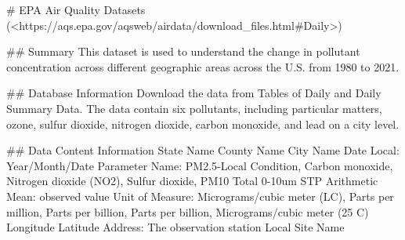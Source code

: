 # EPA Air Quality Datasets (<https://aqs.epa.gov/aqsweb/airdata/download_files.html#Daily>)

## Summary
This dataset is used to understand the change in pollutant concentration across different geographic areas across the U.S. from 1980 to 2021. 

## Database Information
Download the data from Tables of Daily and Daily Summary Data. 
The data contain six pollutants, including particular matters, ozone, sulfur dioxide, nitrogen dioxide, carbon monoxide, and lead on a city level. 

## Data Content Information
State Name
County Name
City Name
Date Local: Year/Month/Date
Parameter Name: PM2.5-Local Condition, Carbon monoxide, Nitrogen dioxide (NO2), Sulfur dioxide, PM10 Total 0-10um STP 
Arithmetic Mean: observed value
Unit of Measure: Micrograms/cubic meter (LC), Parts per million, Parts per billion, Parts per billion, Micrograms/cubic meter (25 C)
Longitude 
Latitude
Address: The observation station 
Local Site Name
